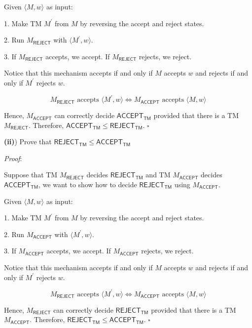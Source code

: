 \documentclass[a4paper, 11pt]{article}
\renewcommand{\part}[1] {\vspace{.10in} {\bf (#1)}}
\begin{document}
	Given $\langle M, w \rangle$ as input:
	
	1. Make TM $M^\prime$ from $M$ by reversing the accept and reject states.
	
	2. Run $M_{\textsf{REJECT}}$ with $\langle M^\prime, w \rangle$.
	
	3. If $M_{\textsf{REJECT}}$ accepts, we accept. If $M_{\textsf{REJECT}}$ rejects, we reject.
	
	Notice that this mechanism accepts if and only if $M$ accepts $w$ and rejects if and only if $M^\prime$ rejects $w$. 
	
	$$ M_{\textsf{REJECT}} \text{ accepts }\langle M^\prime,w \rangle \iff M_{\textsf{ACCEPT}} \text{ accepts } \langle M,w\rangle $$
	
	Hence, $M_{\textsf{ACCEPT}}$ can correctly decide $\textsf{ACCEPT}_{\textsf{TM}}$ provided that there is a TM $M_{\textsf{REJECT}}$. Therefore, $\textsf{ACCEPT}_{\textsf{TM}} \leq \textsf{REJECT}_{\textsf{TM}} $. $\square$
	
	\part{ii}) Prove that $\textsf{REJECT}_{\textsf{TM}} \leq \textsf{ACCEPT}_{\textsf{TM}} $
	
	
	{\em Proof}: 
	
	Suppose that TM $M_{\textsf{REJECT}}$ decides $\textsf{REJECT}_{\textsf{TM}}$ and TM $M_{\textsf{ACCEPT}}$ decides $\textsf{ACCEPT}_{\textsf{TM}}$, we want to show how to decide $\textsf{REJECT}_{\textsf{TM}}$ using $M_{\textsf{ACCEPT}}$.
	
	Given $\langle M, w \rangle$ as input:
	
	1. Make TM $M^\prime$ from $M$ by reversing the accept and reject states.
	
	2. Run $M_{\textsf{ACCEPT}}$ with $\langle M^\prime, w \rangle$.
	
	3. If $M_{\textsf{ACCEPT}}$ accepts, we accept. If $M_{\textsf{ACCEPT}}$ rejects, we reject.
	
	Notice that this mechanism accepts if and only if $M$ accepts $w$ and rejects if and only if $M^\prime$ rejects $w$. 
	
	$$ M_{\textsf{REJECT}} \text{ accepts }\langle M^\prime,w \rangle \iff M_{\textsf{ACCEPT}} \text{ accepts } \langle M,w\rangle $$
	
	Hence, $M_{\textsf{REJECT}}$ can correctly decide $\textsf{REJECT}_{\textsf{TM}}$ provided that there is a TM $M_{\textsf{ACCEPT}}$. Therefore, $\textsf{REJECT}_{\textsf{TM}} \leq \textsf{ACCEPT}_{\textsf{TM}} $. $\square$
	
\end{document}
